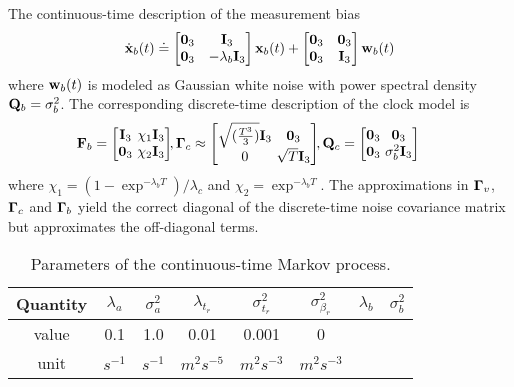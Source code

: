 The continuous-time description of the measurement bias
\begin{align}
	\dot{\mathbf{x}}_b(t) \doteq 
	\begin{bmatrix}
		\boldsymbol{0}_3 & \mathbf{I}_3 \\ \boldsymbol{0}_3 & -\lambda_b \mathbf{I}_3
	\end{bmatrix} 
	\mathbf{x}_b(t) +
	\begin{bmatrix} \boldsymbol{0}_3 & \boldsymbol{0}_3 \\ \boldsymbol{0}_3 & \mathbf{I}_3 \end{bmatrix} \mathbf{w}_b(t)
\end{align}
where $\mathbf{w}_b(t)$ is modeled as Gaussian white noise with power spectral density $\mathbf{Q}_b = \sigma_b^2$. 
The corresponding discrete-time description of the clock model is 
\begin{align}
	& \dss \BoldF_b = 
	\begin{bmatrix}
		\BoldI_3 \dss & \chi_1 \BoldI_3 \\ \0_3 \dss & \chi_2 \BoldI_3
	\end{bmatrix} \ds,
	\BoldGamma_c \approx
	\begin{bmatrix}
		\sqrt{(\frac{T^3}{3})} \BoldI_{3} \dss & \0_3 \\
		0 \dss & \sqrt{T} \BoldI_3
	\end{bmatrix} \ds,  
	\BoldQ_{c} = 
	\begin{bmatrix}
		\0_3 \dss & \0_3 \\ \0_3 \dss & \sigma_{b}^2 \BoldI_3
	\end{bmatrix}
\end{align}
where $\chi_1 = (1 - \exp^{-\lambda_b T})/ \lambda_c$ and $\chi_2 = \exp^{-\lambda_b T}$.
The approximations in $\boldsymbol{\Gamma}_v$, $\boldsymbol{\Gamma}_c$ and $\boldsymbol{\Gamma}_b$ yield the correct diagonal of the discrete-time noise covariance matrix but approximates the off-diagonal terms.

\begin{table}[h!]
	\centering
	\begin{tabular}[h]{|c|c|c|c|c|c|c|c|}
		\hline
		Quantity & 	$\lambda_a$ & $\sigma_a^2$ & $\lambda_{t_r}$ & $\sigma_{t_r}^2$ & $\sigma_{\beta_r}^2$ & $\lambda_b$ & $\sigma_b^2$ \T \\ \hline
		value	 &  0.1 & 1.0 & 0.01 & 0.001 & 0 & &  \T \\ \hline
		unit	 &  $s^{-1}$ & $s^{-1}$ &  $m^2s^{-5}$ & $m^2s^{-3}$ & $m^2s^{-3}$ &  &  \T \\ \hline				
	\end{tabular}
	\caption{Parameters of the continuous-time Markov process.}
	\label{table:error_std_prediction}
\end{table}